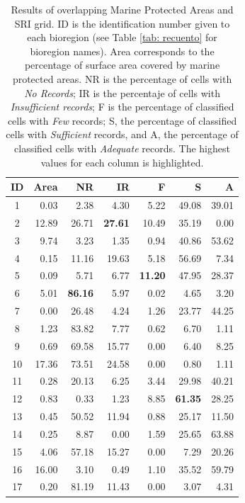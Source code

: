 \documentclass[12pt,authoryear]{elsarticle}
\begin{document}
\begin{table}[]
    \centering
    \caption{Results of overlapping Marine Protected Areas and SRI grid. ID is the identification number given to each bioregion (see Table \ref{tab: recuento} for bioregion names). Area corresponds to the percentage of surface area covered by marine protected areas. NR is the percentage of cells with \textit{No Records}; IR is the percentaje of cells with \textit{Insufficient records}; F is the percentage of classified cells with \textit{Few} records; S, the percentage of classified cells with \textit{Sufficient} records, and A, the percentage of classified cells with \textit{Adequate} records. The highest values for each column is highlighted.}
\label{tab:AP}
\begin{tabular}{c | r r r r r r }
  \textbf{ID} & \textbf{Area} & \textbf{NR} & \textbf{IR} & \textbf{F} & \textbf{S} & \textbf{A} \\ 
  \hline
  \hline
   1 &  0.03 &   2.38 &  4.30 &  5.22 & 49.08 & 39.01 \\ 
   2 & 12.89 &  26.71 & \textbf{27.61} & 10.49 & 35.19 &  0.00 \\ 
   3 &  9.74 &   3.23 &  1.35 &  0.94 & 40.86 & 53.62 \\ 
   4 &  0.15 &  11.16 & 19.63 &  5.18 & 56.69 &  7.34 \\ 
   5 &  0.09 &   5.71 &  6.77 & \textbf{11.20} & 47.95 & 28.37 \\ 
   6 &  5.01 &  \textbf{86.16} &  5.97 &  0.02 &  4.65 &  3.20 \\ 
   7 &  0.00 &  26.48 &  4.24 &  1.26 & 23.77 & 44.25 \\ 
   8 &  1.23 &  83.82 &  7.77 &  0.62 &  6.70 &  1.11 \\ 
   9 &  0.69 &  69.58 & 15.77 &  0.00 &  6.40 &  8.25 \\ 
  10 & 17.36 &  73.51 & 24.58 &  0.00 &  0.80 &  1.11 \\  
  11 &  0.28 &  20.13 &  6.25 &  3.44 & 29.98 & 40.21 \\ 
  12 &  0.83 &   0.33 &  1.23 &  8.85 & \textbf{61.35} & 28.25 \\ 
  13 &  0.45 &  50.52 & 11.94 &  0.88 & 25.17 & 11.50 \\ 
  14 &  0.25 &   8.87 &  0.00 &  1.59 & 25.65 & 63.88 \\ 
  15 &  4.06 &  57.18 & 15.27 &  0.00 &  7.29 & 20.26 \\ 
  16 & 16.00 &   3.10 &  0.49 &  1.10 & 35.52 & 59.79 \\ 
  17 &  0.20 &  81.19 & 11.43 &  0.00 &  3.07 &  4.31 \\ 

\end{tabular}
\end{table}
\end{document}

